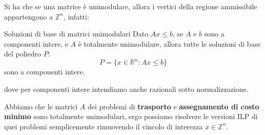 \documentclass[a4paper,11pt]{article}
\begin{document}
Si ha che se una matrice è unimodulare, allora i vertici della regione ammissibile appartengono a $\mathbb{Z}^n$, infatti:
\begin{theorem}{Soluzioni di base di matrici unimodulari}
	Dato $Ax \leq b$, se $A$ e $b$ sono a componenti intere, e $A$ è totalmente unimodulare, allora tutte le soluzioni di base del poliedro $P$:
	$$
		P = \{ x \in \mathbb{R}^n : Ax \leq b \}
	$$
	sono a componenti intere.
\end{theorem}
dove per componenti intere intendiamo anche razionali sotto normalizzazione.

Abbiamo che le matrici $A$ dei problemi di \textbf{trasporto} e \textbf{assegnamento di costo minimo} sono totalmente unimodulari, ergo possiamo risolvere le versioni ILP di quei problemi semplicemente rimuovendo il vincolo di interezza $x \in \mathbb{Z}^n$.
\end{document}

